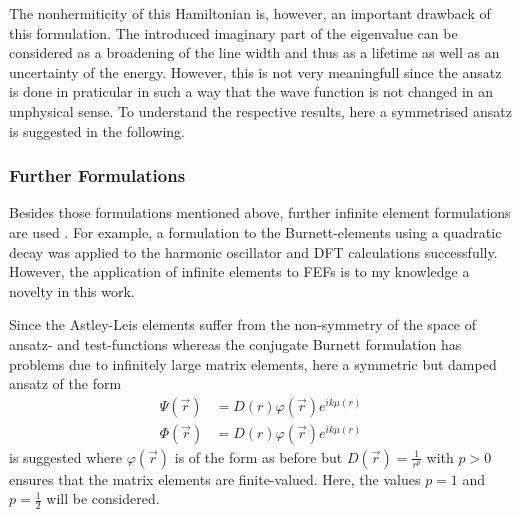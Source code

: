 The nonhermiticity of this Hamiltonian is, however, an important drawback of this formulation.
The introduced imaginary part of the eigenvalue can be considered as a broadening of the line width and thus as a lifetime as well as an uncertainty of the energy.
However, this is not very meaningfull since the ansatz is done in praticular in such a way that the wave function is not changed in an unphysical sense.
To understand the respective results, here a symmetrised ansatz is suggested in the following.

\subsubsection{Further Formulations}
Besides those formulations mentioned above, further infinite element formulations are used \cite{dreyer}.
For example, a formulation to the Burnett-elements using a quadratic decay was applied to the harmonic oscillator \cite{bettessHarmonic} and DFT calculations \cite{sobaMolecule} successfully.
However, the application of infinite elements to FEFs is to my knowledge a novelty in this work.

Since the Astley-Leis elements suffer from the non-symmetry of the space of ansatz- and test-functions whereas the conjugate Burnett formulation has problems due to infinitely large matrix elements, here a symmetric but damped ansatz of the form
\begin{align} \label{eq:ALsymm}
\Psi(\vec{r}) &= D(r)\varphi(\vec{r}) e^{ik\mu(r)} \\
\Phi(\vec{r}) &= D(r)\varphi(\vec{r}) e^{ik\mu(r)}
\end{align}
is suggested where $\varphi(\vec{r})$ is of the form as before but $D(\vec{r})=\frac{1}{r^p}$ with $p>0$ ensures that the matrix elements are finite-valued.
Here, the values $p=1$ and $p=\frac 12$ will be considered.

